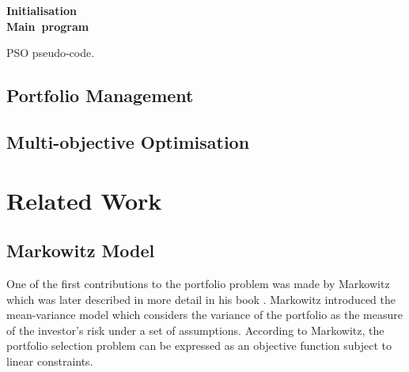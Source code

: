 \documentclass{pdfmx4020}
\begin{document}
    \begin{algorithm}[H] \label{eq:pso}
      \mbox{\textbf{Initialisation}} \\
      \mbox{\textbf{Main program}} \\      
      \caption{PSO pseudo-code.}
    \end{algorithm}
    

  \section{Portfolio Management} %
  \label{sec:portfolio_management}
  

  \section{Multi-objective Optimisation} %
  \label{sec:multi_objective_optimisation}
  


\chapter{Related Work}
  \section{Markowitz Model} %
  \label{sec:markowitz_model}
    One of the first contributions to the portfolio problem was made by Markowitz \cite{marko1} which was later described in more detail in his book \cite{marko2}. Markowitz introduced the mean-variance model which considers the variance of the portfolio as the measure of the investor's risk under a set of assumptions. According to Markowitz, the portfolio selection problem can be expressed as an objective function subject to linear constraints. 
\end{document}
